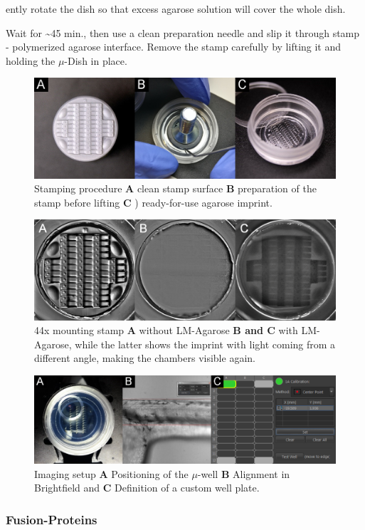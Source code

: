 \documentclass[11pt,singlespacinge,twoside]{reedthesis} %
\begin{document}
ently rotate the dish so that excess agarose solution will cover the whole dish.

Wait for \textasciitilde{}45 min., then use a clean preparation needle and slip it through stamp - polymerized agarose interface. Remove the stamp carefully by lifting it and holding the \(\mu\)-Dish in place.


\begin{figure}

{\centering \includegraphics[width=0.6\linewidth]{figure/02-MaMo/Mount/stampprod} 

}

\caption[Stamping procedure]{Stamping procedure \textbf{A} clean stamp surface \textbf{B} preparation of the stamp before lifting \textbf{C} ) ready-for-use agarose imprint.}\label{fig:stampprod}
\end{figure}

\begin{figure}

{\centering \includegraphics[width=0.6\linewidth]{figure/02-MaMo/Mount/mounting} 

}

\caption[44x mounting stamp]{44x mounting stamp \textbf{A} without LM-Agarose \textbf{B and C} with LM-Agarose, while the latter shows the imprint with light coming from a different angle, making the chambers visible again.}\label{fig:mounting}
\end{figure}

\begin{figure}

{\centering \includegraphics[width=0.6\linewidth]{figure/02-MaMo/Mount/setup} 

}

\caption[Imaging setup]{Imaging setup \textbf{A} Positioning of the \(\mu\)-well \textbf{B} Alignment in Brightfield and \textbf{C} Definition of a custom well plate.}\label{fig:setup}
\end{figure}
\hypertarget{Fsnprot-met}{%
\subsubsection{Fusion-Proteins}\label{Fsnprot-met}}
\end{document}
